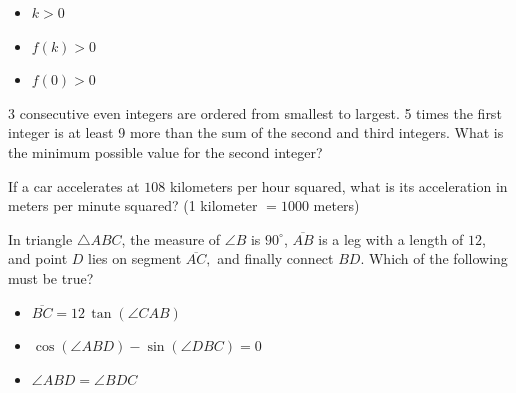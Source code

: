 \begin{itemize}
\item[I.] $k>0$
\item[II.] $f(k)>0$
\item[III.] $f(0)>0$
\end{itemize}

\vspace{0.75em}



\newpage

\newpage

\noindent\markforreview
\vspace{1em}

\vspace{1em}

3 consecutive even integers are ordered from smallest to largest. 
5 times the first integer is at least 9 more than the sum of the second and third integers. 
What is the minimum possible value for the second integer?



\vspace{1.5em}

\vspace{2em}

\noindent\markforreview
\vspace{1em}

\vspace{1em}

If a car accelerates at $108$ kilometers per hour squared, what is its acceleration in meters per minute squared? 
\;(1 kilometer $= 1000$ meters)


\vspace{3em}

\newpage

\noindent\markforreview
\vspace{1em}

\vspace{1em}

In triangle $\triangle ABC$, the measure of $\angle B$ is $90^\circ$, $\overline{AB}$ is a leg with a length of $12$, and point $D$ lies on segment $\overline{AC},$ and finally connect $BD$.
Which of the following must be true?

\begin{itemize}
\item[I.] $\overline{BC}=12\,\tan(\angle CAB)$
\item[II.] $\cos(\angle ABD)-\sin(\angle DBC)=0$
\item[III.] $\angle ABD=\angle BDC$
\end{itemize}

